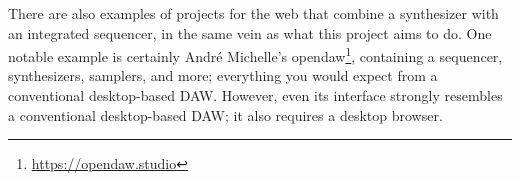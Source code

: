 There are also examples of projects for the web that combine a synthesizer with an integrated 
sequencer, in the same vein as what this project aims to do. One notable example is certainly André 
Michelle's opendaw\footnote{\url{https://opendaw.studio}}, containing a sequencer, synthesizers, 
samplers, and more; everything you would expect from a conventional desktop-based DAW. However, even 
its interface strongly resembles a conventional desktop-based DAW; it also requires a desktop browser.